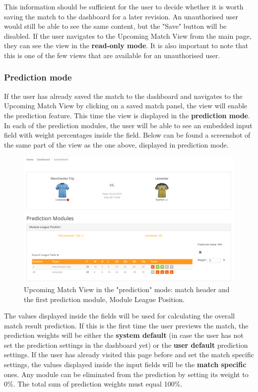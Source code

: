 This information should be sufficient for the user to decide whether it is worth saving the match to the dashboard for a later revision. An unauthorised user would still be able to see the same content, but the "Save" button will be disabled. If the user navigates to the Upcoming Match View from the main page, they can see the view in the \textbf{read-only mode}. It is also important to note that this is one of the few views that are available for an unauthorised user.

\subsubsection*{Prediction mode}
\label{subsubsec:predictionmode_implementation}
If the user has already saved the match to the dashboard and navigates to the Upcoming Match View by clicking on a saved match panel, the view will enable the prediction feature. This time the view is displayed in the \textbf{prediction mode}. In each of the prediction modules, the user will be able to see an embedded input field with weight percentages inside the field. Below can be found a screenshot of the same part of the view as the one above, displayed in prediction mode.

\begin{figure}[H]
	\begin{center}
		\includegraphics[width=.90\textwidth]{impl/images/upcomingMatchViewSM}
		\caption{Upcoming Match View in the "prediction" mode: match header and the first prediction module, Module League Position.} 	  \label{fig:using:upcominmatchviewSM}
	\end{center}
\end{figure}

The values displayed inside the fields will be used for calculating the overall match result prediction. If this is the first time the user previews the match, the prediction weights will be either the \textbf{system default} (in case the user has not set the prediction settings in the dashboard yet) or the \textbf{user default} prediction settings. If the user has already visited this page before and set the match specific settings, the values displayed inside the input fields will be the \textbf{match specific} ones. Any module can be eliminated from the prediction by setting its weight to 0\%. The total sum of prediction weights must equal 100\%.

